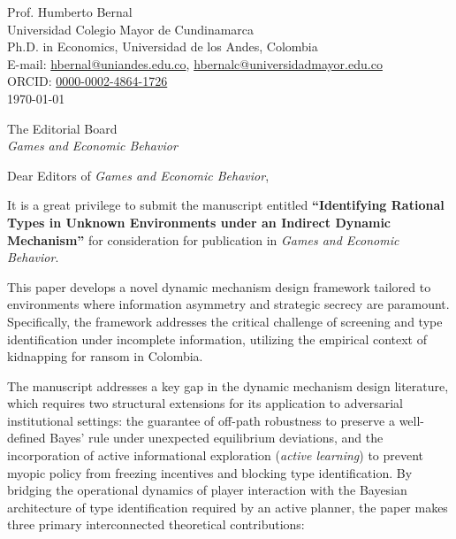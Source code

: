 \documentclass[12pt]{article}
\begin{document}
\singlespacing

\begin{flushright}
Prof. Humberto Bernal \\
Universidad Colegio Mayor de Cundinamarca \\
Ph.D. in Economics, Universidad de los Andes, Colombia \\
E-mail: \href{mailto:hbernal@uniandes.edu.co}{hbernal@uniandes.edu.co}, \href{mailto:hbernalc@universidadmayor.edu.co}{hbernalc@universidadmayor.edu.co} \\
ORCID: \href{https://orcid.org/0000-0002-4864-1726}{0000-0002-4864-1726} \\
\today
\end{flushright}

\vspace{1.5em}

\begin{flushleft}
The Editorial Board \\
\textit{Games and Economic Behavior}
\end{flushleft}

\vspace{1.5em}

\noindent Dear Editors of \textit{Games and Economic Behavior},

\vspace{1.5em}

\noindent It is a great privilege to submit the manuscript entitled \textbf{``Identifying Rational Types in Unknown Environments under an Indirect Dynamic Mechanism''} for consideration for publication in \textit{Games and Economic Behavior}.

This paper develops a novel dynamic mechanism design framework tailored to environments where information asymmetry and strategic secrecy are paramount. Specifically, the framework addresses the critical challenge of screening and type identification under incomplete information, utilizing the empirical context of kidnapping for ransom in Colombia. 

The manuscript addresses a key gap in the dynamic mechanism design literature, which requires two structural extensions for its application to adversarial institutional settings: the guarantee of off-path robustness to preserve a well-defined Bayes' rule under unexpected equilibrium deviations, and the incorporation of active informational exploration (\textit{active learning}) to prevent myopic policy from freezing incentives and blocking type identification. By bridging the operational dynamics of player interaction with the Bayesian architecture of type identification required by an active planner, the paper makes three primary interconnected theoretical contributions:
\end{document}
